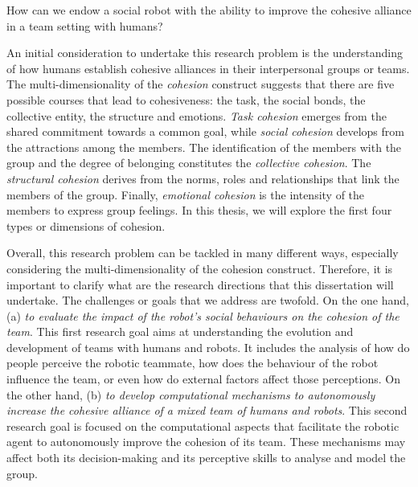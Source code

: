 \begin{indented}
How can we endow a social robot with the ability to improve the cohesive alliance in a team setting with humans?
\end{indented}

An initial consideration to undertake this research problem is the understanding of how humans establish cohesive alliances in their interpersonal groups or teams. The multi-dimensionality of the \textit{cohesion} construct suggests that there are five possible courses that lead to cohesiveness: the task, the social bonds, the collective entity, the structure and emotions. \textit{Task cohesion} emerges from the shared commitment towards a common goal, while \textit{social cohesion} develops from the attractions among the members. The identification of the members with the group and the degree of belonging constitutes the \textit{collective cohesion}. The \textit{structural cohesion} derives from the norms, roles and relationships that link the members of the group. Finally, \textit{emotional cohesion} is the intensity of the members to express group feelings. In this thesis, we will explore the first four types or dimensions of cohesion.

Overall, this research problem can be tackled in many different ways, especially considering the multi-dimensionality of the cohesion construct. Therefore, it is important to clarify what are the research directions that this dissertation will undertake. The challenges or goals that we address are twofold. On the one hand, (a) \textit{to evaluate the impact of the robot's social behaviours on the cohesion of the team}. This first research goal aims at understanding the evolution and development of teams with humans and robots. It includes the analysis of how do people perceive the robotic teammate, how does the behaviour of the robot influence the team, or even how do external factors affect those perceptions. On the other hand, (b) \textit{to develop computational mechanisms to autonomously increase the cohesive alliance of a mixed team of humans and robots}. This second research goal is focused on the computational aspects that facilitate the robotic agent to autonomously improve the cohesion of its team. These mechanisms may affect both its decision-making and its perceptive skills to analyse and model the group.



